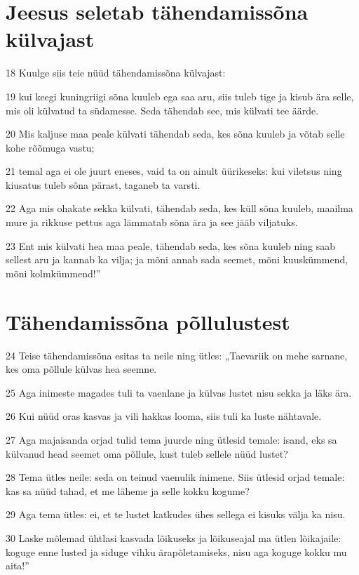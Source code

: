 \section*{Jeesus seletab tähendamissõna külvajast}

\par 18 Kuulge siis teie nüüd tähendamissõna külvajast:
\par 19 kui keegi kuningriigi sõna kuuleb ega saa aru, siis tuleb tige ja kisub ära selle, mis oli külvatud ta südamesse. Seda tähendab see, mis külvati tee äärde.
\par 20 Mis kaljuse maa peale külvati tähendab seda, kes sõna kuuleb ja võtab selle kohe rõõmuga vastu;
\par 21 temal aga ei ole juurt eneses, vaid ta on ainult üürikeseks: kui viletsus ning kiusatus tuleb sõna pärast, taganeb ta varsti.
\par 22 Aga mis ohakate sekka külvati, tähendab seda, kes küll sõna kuuleb, maailma mure ja rikkuse pettus aga lämmatab sõna ära ja see jääb viljatuks.
\par 23 Ent mis külvati hea maa peale, tähendab seda, kes sõna kuuleb ning saab sellest aru ja kannab ka vilja; ja mõni annab sada seemet, mõni kuuskümmend, mõni kolmkümmend!”

\section*{Tähendamissõna põllulustest}

\par 24 Teise tähendamissõna esitas ta neile ning ütles: „Taevariik on mehe sarnane, kes oma põllule külvas hea seemne.
\par 25 Aga inimeste magades tuli ta vaenlane ja külvas lustet nisu sekka ja läks ära.
\par 26 Kui nüüd oras kasvas ja vili hakkas looma, siis tuli ka luste nähtavale.
\par 27 Aga majaisanda orjad tulid tema juurde ning ütlesid temale: isand, eks sa külvanud head seemet oma põllule, kust tuleb sellele nüüd lustet?
\par 28 Tema ütles neile: seda on teinud vaenulik inimene. Siis ütlesid orjad temale: kas sa nüüd tahad, et me läheme ja selle kokku kogume?
\par 29 Aga tema ütles: ei, et te lustet katkudes ühes sellega ei kisuks välja ka nisu.
\par 30 Laske mõlemad ühtlasi kasvada lõikuseks ja lõikuseajal ma ütlen lõikajaile: koguge enne lusted ja siduge vihku ärapõletamiseks, nisu aga koguge kokku mu aita!”

